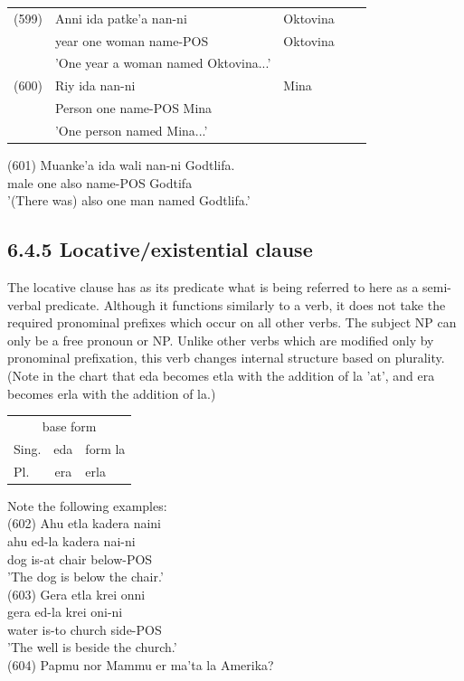 \documentclass[10pt]{article}
\begin{document}
\begin{center}
\begin{tabular}{lllll}
(599) & Anni ida patke'a nan-ni & Oktovina &  \\
 & year one woman name-POS & Oktovina &  \\
 & 'One year a woman named Oktovina...' &  &  \\
(600) & Riy ida nan-ni & Mina &  \\
 & Person one name-POS Mina &  &  \\
 & 'One person named Mina...' &  &  \\
\end{tabular}
\end{center}

(601) Muanke'a ida wali nan-ni Godtlifa.\\
male one also name-POS Godtifa\\
'(There was) also one man named Godtlifa.'

\subsection*{6.4.5 Locative/existential clause}
The locative clause has as its predicate what is being referred to here as a semi-verbal predicate. Although it functions similarly to a verb, it does not take the required pronominal prefixes which occur on all other verbs. The subject NP can only be a free pronoun or NP. Unlike other verbs which are modified only by pronominal prefixation, this verb changes internal structure based on plurality. (Note in the chart that eda becomes etla with the addition of la 'at', and era becomes erla with the addition of la.)

\begin{center}
\begin{tabular}{|lcl|}
\hline
\multicolumn{3}{|c|}{base form} \\
Sing. & eda & form la \\
Pl. & era & erla \\
\hline
\end{tabular}
\end{center}

Note the following examples:\\
(602) Ahu etla kadera naini\\
ahu ed-la kadera nai-ni\\
dog is-at chair below-POS\\
'The dog is below the chair.'\\
(603) Gera etla krei onni\\
gera ed-la krei oni-ni\\
water is-to church side-POS\\
'The well is beside the church.'\\
(604) Papmu nor Mammu er ma'ta la Amerika?
\end{document}
